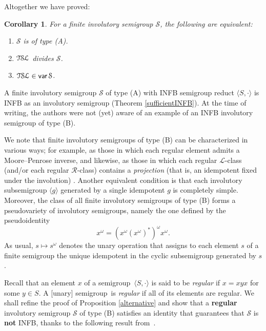 \documentclass[smallextended]{svjour3}
\def\Rc{\mathrel{\mathscr{R}}}
\def\Lc{\mathrel{\mathscr{L}}}
\newcommand{\sgp}{semi\-group}
\newcommand{\TSL}{\ensuremath{\mathcal{T\kern-.5pt S\kern-.5pt L}}}
\newtheorem{Cor}[Thm]{Corollary}
\DeclareMathOperator{\var}{\mathsf{var}}
\begin{document}
Altogether we have proved:
\begin{Cor}\label{TSLinvarS} For a finite involutory semigroup $\mathcal{S}$, the following are equivalent:
\begin{enumerate}
\item $\mathcal{S}$ is of type (A).
\item $\TSL$ divides $\mathcal{S}$.
\item $\TSL\in \var\mathcal{S}$.
\end{enumerate}
\end{Cor}

A finite involutory semigroup $\mathcal{S}$ of type (A) with INFB semigroup reduct $\langle S,\cdot\rangle$ is INFB as
an involutory semigroup (Theorem \ref{sufficientINFB}). At the time of writing, the authors were not (yet) aware of an
example of an INFB involutory semigroup of type (B).

We note that finite involutory semigroups of type (B) can be characterized in various ways; for example, as those in which each regular
element admits a Moore--Penrose inverse, and likewise, as those in which each regular ${\Lc}$-class (and/or each regular ${\Rc}$-class)
contains a \emph{projection} (that is, an idempotent fixed under the involution) \cite{NP}. Another equivalent condition is that each
involutory subsemigroup $\langle g\rangle$ generated by a single idempotent $g$ is completely simple. Moreover, the class of all finite
involutory semigroups of type (B) forms a pseudovariety of involutory semigroups, namely the one defined by the pseudoidentity
$$x^\omega=(x^\omega(x^\omega)^*)^\omega x^\omega.$$
As usual, $s\mapsto s^\omega$ denotes the unary operation that assigns to each element $s$ of a finite semigroup the unique idempotent in
the cyclic subsemigroup generated by $s$.

Recall that an element $x$ of a \sgp\ $\langle S,\cdot\rangle$ is said to be \emph{regular} if $x=xyx$ for some $y\in S$. A [unary] \sgp\
is \emph{regular} if all of its elements are regular. We shall refine the proof of Proposition \ref{alternative} and show that a
\textbf{regular} involutory semigroup $\mathcal{S}$ of type (B) satisfies an identity that guarantees that $\mathcal{S}$ is \textbf{not}
INFB, thanks to the following result from~\cite{ADV:2012}.
\end{document}
